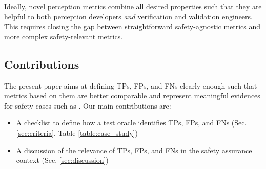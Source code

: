 \documentclass[conference]{IEEEtran}
\begin{document}
Ideally, novel perception metrics combine all desired properties such that they are helpful to both perception developers \textit{and} verification and validation engineers. 
This requires closing the gap between straightforward safety-agnostic metrics and more complex safety-relevant metrics. 

\subsection{Contributions}
\label{sec:introduction_contrib}
The present paper aims at defining TPs, FPs, and FNs clearly enough such that metrics based on them are better comparable and represent meaningful evidences for safety cases such as \cite{Borg2022smirk}. 
Our main contributions are:
\begin{itemize}
\item A checklist to define how a test oracle identifies TPs, FPs, and FNs (Sec. \ref{sec:criteria}, Table \ref{table:case_study})
\item A discussion of the relevance of TPs, FPs, and FNs in the safety assurance context (Sec. \ref{sec:discussion})
\end{itemize}


\end{document}
